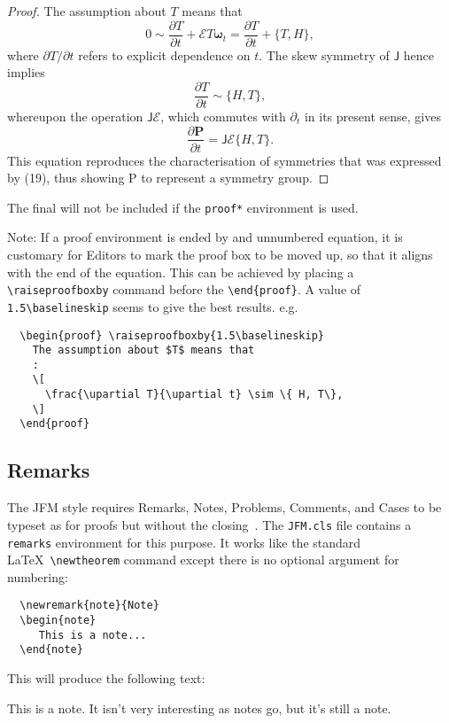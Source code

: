 \documentclass{jfm}
\providecommand\upartial{\partial}%
\providecommand\upartial{\partial}%
\providecommand\bomega{\boldsymbol{\omega}}
\newcommand\bldP{\boldsymbol{P}}
\newcommand\eg{e.g.\ }
\begin{document}
\begin{proof}
  The assumption about $T$ means that
  \[
    0 \sim \frac{\upartial T}{\upartial t} +
    \mathcal{E}T \bomega_t
    = \frac{\upartial T}{\upartial t} + \{ T, H\},
  \]
  where $\upartial T / \upartial t$ refers to explicit
  dependence on $t$. The skew symmetry of  $\mathsf{J}$ hence implies
  \begin{equation}
    \frac{\upartial T}{\upartial t} \sim \{ H, T\},
  \end{equation}
  whereupon the operation $\mathsf{J} \mathcal{E}$, which commutes with
  $\upartial_t$ in its present sense, gives
  \[
    \frac{\upartial {\bldP}}{\upartial t}=\mathsf{J}\mathcal{E}\{ H, T\}.
  \]
  This equation reproduces the characterisation of symmetries that was
  expressed by (19), thus showing $\mathrm{P}$ to represent a symmetry
  group.
\end{proof}

The final \usebox{\proofbox} will not be included if the \verb"proof*"
environment is used.

\ifCUPmtlplainloaded
\smallskip
Note: If a proof environment is ended by and unnumbered equation, it is
customary for Editors to mark the proof box to be moved up, so that it
aligns with the end of the equation.  This can be achieved by placing a
\verb"\raiseproofboxby" command before the \verb"\end{proof}".
A value of \verb"1.5\baselineskip" seems to give the best results. \eg
\begin{verbatim}
  \begin{proof} \raiseproofboxby{1.5\baselineskip}
    The assumption about $T$ means that
    :
    \[
      \frac{\upartial T}{\upartial t} \sim \{ H, T\},
    \]
  \end{proof}
\end{verbatim}
\fi

\subsection{Remarks}

The JFM style requires Remarks, Notes, Problems, Comments, and Cases to be
typeset as for proofs but without the closing \usebox{\proofbox}\,.  The
\verb"JFM.cls" file contains a \verb"remarks" environment for this purpose.
It works like the standard \LaTeX\ \verb"\newtheorem" command except there
is no optional argument for numbering:
%
\begin{verbatim}
  \newremark{note}{Note}
  \begin{note}
     This is a note...
  \end{note}
\end{verbatim}
%
This will produce the following text:
\begin{note}
This is a note.  It isn't very interesting as notes go, but it's still
a note.
\end{note}
\end{document}
